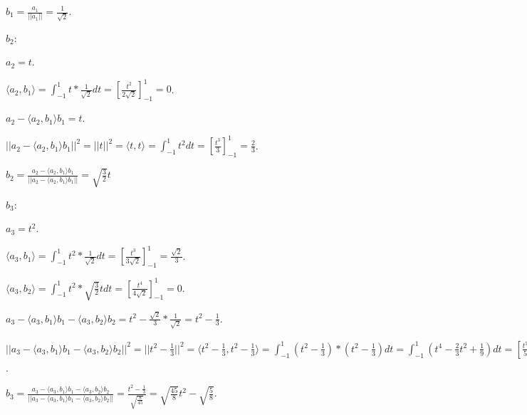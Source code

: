 \documentclass{article}
\begin{document}
$b_1 = \frac{a_1}{||a_1||} 
= \frac{1}{\sqrt{2}}$.
\newline


\underline{$b_2$}:

$a_2 = t$.
\newline

$\langle a_2, b_1\rangle 
= \int_{-1}^{1} t*\frac{1}{\sqrt{2}} dt 
= [\frac{t^2}{2\sqrt{2}}]_{-1}^{1} = 0$.
\newline

$a_2 - \langle a_2, b_1\rangle b_1 = t$.
\newline

$||a_2 - \langle a_2, b_1\rangle b_1||^2 
= ||t||^2 = \langle t, t \rangle 
= \int_{-1}^{1} t^2 dt 
= [\frac{t^3}{3}]_{-1}^{1} 
= \frac{2}{3}$.
\newline

$b_2 = \frac{a_2 - \langle a_2, b_1\rangle b_1}{||a_2 - \langle a_2, b_1\rangle b_1||} 
= \sqrt{\frac{3}{2}}t$
\newline


\underline{$b_3$}:

$a_3 = t^2$.
\newline

$\langle a_3, b_1\rangle = \int_{-1}^{1} t^2*\frac{1}{\sqrt{2}} dt 
= [\frac{t^3}{3\sqrt{2}}]_{-1}^{1} 
= \frac{\sqrt{2}}{3}$.
\newline

$\langle a_3, b_2\rangle 
= \int_{-1}^{1} t^2*\sqrt{\frac{3}{2}}t dt 
= [\frac{t^4}{4\sqrt{2}}]_{-1}^{1} 
= 0$.
\newline

$a_3 - \langle a_3, b_1\rangle b_1 - \langle a_3, b_2\rangle b_2 
= t^2 - \frac{\sqrt{2}}{3} * \frac{1}{\sqrt{2}}
= t^2 - \frac{1}{3}$.
\newline

$||a_3 - \langle a_3, b_1\rangle b_1 - \langle a_3, b_2\rangle b_2||^2
= ||t^2 - \frac{1}{3}||^2
= \langle t^2 - \frac{1}{3}, t^2 - \frac{1}{3}\rangle
= \int_{-1}^{1} (t^2 - \frac{1}{3})*(t^2 - \frac{1}{3}) dt
= \int_{-1}^{1} (t^4 - \frac{2}{3} t^2 + \frac{1}{9}) dt
= [\frac{t^5}{5} - \frac{2}{9} t^3 + \frac{1}{9} t]_{-1}^{1}
= \frac{8}{45}$.
\newline

$b_3 = \frac{a_3 - \langle a_3, b_1\rangle b_1 - \langle a_3, b_2\rangle b_2}{||a_3 - \langle a_3, b_1\rangle b_1 - \langle a_3, b_2\rangle b_2||}
= \frac{t^2 - \frac{1}{3}}{\sqrt{\frac{8}{45}}}
= \sqrt{\frac{45}{8}} t^2 - \sqrt{\frac{5}{8}}$.
\newline
\end{document}
